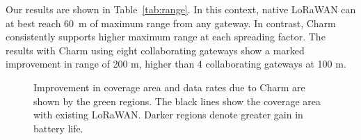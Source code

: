 Our results are shown in Table~\ref{tab:range}. 
In this context, native LoRaWAN can at best reach 60~m of maximum range from
any gateway. In contrast, Charm consistently supports higher maximum range at
each spreading factor. The results with Charm using eight collaborating
gateways show a marked improvement in range of 200 m, higher than 4
collaborating gateways at 100 m.



\begin{figure}[htb]
\centering
{} \hfill
{} \hfill
{}
\compactimg
\caption{Improvement in coverage area and data rates due to Charm are shown by the green regions. The black lines show the coverage area with existing LoRaWAN. Darker regions denote greater gain in battery life.}
\label{fig:charm-improvement}
\compactimg
\end{figure}


